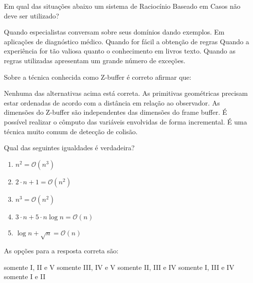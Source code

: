 \documentclass[12pt, addpoints]{exam}
\begin{document}
\begin{questions}
\question

Em qual das situações abaixo um sistema de Raciocínio Baseado em Casos não deve ser utilizado?


\begin{choices}
\choice Quando especialistas conversam sobre seus domínios dando exemplos.
\choice Em aplicações de diagnóstico médico.
\choice Quando for fácil a obtenção de regras
\choice Quando a experiência for tão valiosa quanto o conhecimento em livros texto.
\choice Quando as regras utilizadas apresentam um grande número de exceções.
\end{choices}

\question

Sobre a técnica conhecida como Z-buffer é correto afirmar que:
\begin{choices}
\choice Nenhuma das alternativas acima está correta. 
\choice As primitivas geométricas precisam estar ordenadas de acordo com a distância em relação ao observador. 
\choice As dimensões do Z-buffer são independentes das dimensões do frame buffer. 
\choice É possível realizar o cômputo das variáveis envolvidas de forma incremental.
\choice É uma técnica muito comum de detecção de colisão. 
\end{choices}

\question

Qual das seguintes igualdades é verdadeira?



\begin{enumerate}

    \item[(I)] \( n^2 = \mathcal{O}(n^3) \)

    \item[(II)] \( 2 \cdot n + 1 = \mathcal{O}(n^2) \)

    \item[(III)] \( n^3 = \mathcal{O}(n^2) \)

    \item[(IV)] \( 3 \cdot n + 5 \cdot n \log n = \mathcal{O}(n) \)

    \item[(V)] \( \log n + \sqrt{n} = \mathcal{O}(n) \)

\end{enumerate}



As opções para a resposta correta são:
\begin{choices}
\choice somente I, II e V
\choice somente III, IV e V
\choice somente II, III e IV
\choice somente I, III e IV
\choice somente I e II
\end{choices}


\end{questions}
\end{document}
